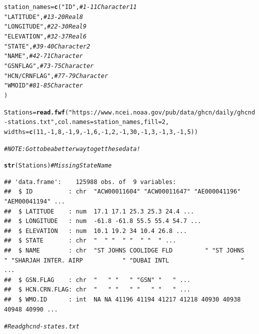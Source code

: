 \documentclass{article}\usepackage[]{graphicx}\usepackage[]{xcolor}
\makeatletter
\newcommand{\hlnum}[1]{\textcolor[rgb]{0.686,0.059,0.569}{#1}}%
\newcommand{\hlstr}[1]{\textcolor[rgb]{0.192,0.494,0.8}{#1}}%
\newcommand{\hlcom}[1]{\textcolor[rgb]{0.678,0.584,0.686}{\textit{#1}}}%
\newcommand{\hlopt}[1]{\textcolor[rgb]{0,0,0}{#1}}%
\newcommand{\hlstd}[1]{\textcolor[rgb]{0.345,0.345,0.345}{#1}}%
\newcommand{\hlkwb}[1]{\textcolor[rgb]{0.69,0.353,0.396}{#1}}%
\newcommand{\hlkwc}[1]{\textcolor[rgb]{0.333,0.667,0.333}{#1}}%
\newcommand{\hlkwd}[1]{\textcolor[rgb]{0.737,0.353,0.396}{\textbf{#1}}}%
\newenvironment{kframe}{%
 \def\at@end@of@kframe{}%
 \ifinner\ifhmode%
  \def\at@end@of@kframe{\end{minipage}}%
  \begin{minipage}{\columnwidth}%
 \fi\fi%
 \def\FrameCommand##1{\hskip\@totalleftmargin \hskip-\fboxsep
 \colorbox{shadecolor}{##1}\hskip-\fboxsep
     \hskip-\linewidth \hskip-\@totalleftmargin \hskip\columnwidth}%
 \MakeFramed {\advance\hsize-\width
   \@totalleftmargin\z@ \linewidth\hsize
   \@setminipage}}%
 {\par\unskip\endMakeFramed%
 \at@end@of@kframe}
\newenvironment{knitrout}{}{} %
\makeatother
\begin{document}
\begin{knitrout}
\color{fgcolor}\begin{kframe}
\begin{alltt}
\hlstd{station_names} \hlkwb{=} \hlkwd{c}\hlstd{(}\hlstr{"ID"}\hlstd{,}             \hlcom{#  1-11   Character   11}
                  \hlstr{"LATITUDE"}\hlstd{,}       \hlcom{# 13-20   Real        8}
                  \hlstr{"LONGITUDE"}\hlstd{,}      \hlcom{# 22-30   Real        9}
                  \hlstr{"ELEVATION"}\hlstd{,}      \hlcom{# 32-37   Real        6}
                  \hlstr{"STATE"}\hlstd{,}          \hlcom{# 39-40   Character   2}
                  \hlstr{"NAME"}\hlstd{,}           \hlcom{# 42-71   Character}
                  \hlstr{"GSN FLAG"}\hlstd{,}       \hlcom{# 73-75   Character}
                  \hlstr{"HCN/CRN FLAG"}\hlstd{,}   \hlcom{# 77-79   Character}
                  \hlstr{"WMO ID"}          \hlcom{# 81-85   Character}
                   \hlstd{)}

\hlstd{Stations} \hlkwb{=} \hlkwd{read.fwf}\hlstd{(}\hlstr{"https://www.ncei.noaa.gov/pub/data/ghcn/daily/ghcnd-stations.txt"}\hlstd{,} \hlkwc{col.names}\hlstd{=station_names,} \hlkwc{fill}\hlstd{=}\hlnum{2}\hlstd{,}
        \hlkwc{widths}\hlstd{=}\hlkwd{c}\hlstd{(}\hlnum{11}\hlstd{,} \hlopt{-}\hlnum{1}\hlstd{,} \hlnum{8}\hlstd{,} \hlopt{-}\hlnum{1}\hlstd{,} \hlnum{9}\hlstd{,} \hlopt{-}\hlnum{1}\hlstd{,} \hlnum{6}\hlstd{,} \hlopt{-}\hlnum{1}\hlstd{,} \hlnum{2}\hlstd{,} \hlopt{-}\hlnum{1}\hlstd{,} \hlnum{30}\hlstd{,} \hlopt{-}\hlnum{1}\hlstd{,} \hlnum{3}\hlstd{,} \hlopt{-}\hlnum{1}\hlstd{,} \hlnum{3}\hlstd{,} \hlopt{-}\hlnum{1}\hlstd{,} \hlnum{5} \hlstd{))}

\hlcom{# NOTE: Got to be a better way to get these data!}

\hlkwd{str}\hlstd{(Stations)} \hlcom{# Missing State Name}
\end{alltt}
\begin{verbatim}
## 'data.frame':	125988 obs. of  9 variables:
##  $ ID          : chr  "ACW00011604" "ACW00011647" "AE000041196" "AEM00041194" ...
##  $ LATITUDE    : num  17.1 17.1 25.3 25.3 24.4 ...
##  $ LONGITUDE   : num  -61.8 -61.8 55.5 55.4 54.7 ...
##  $ ELEVATION   : num  10.1 19.2 34 10.4 26.8 ...
##  $ STATE       : chr  "  " "  " "  " "  " ...
##  $ NAME        : chr  "ST JOHNS COOLIDGE FLD         " "ST JOHNS                      " "SHARJAH INTER. AIRP           " "DUBAI INTL                    " ...
##  $ GSN.FLAG    : chr  "   " "   " "GSN" "   " ...
##  $ HCN.CRN.FLAG: chr  "   " "   " "   " "   " ...
##  $ WMO.ID      : int  NA NA 41196 41194 41217 41218 40930 40938 40948 40990 ...
\end{verbatim}
\begin{alltt}
\hlcom{# Read ghcnd-states.txt}


\end{alltt}
\end{kframe}
\end{knitrout}
\end{document}
